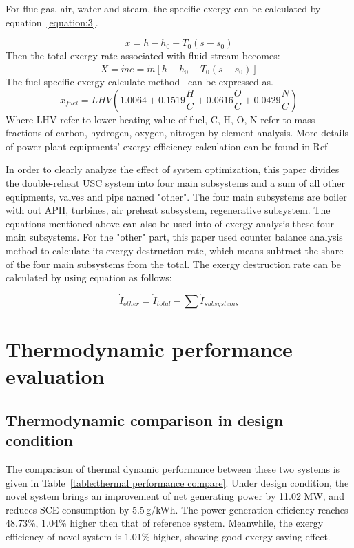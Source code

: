\documentclass[preprint,12pt]{elsarticle}
\begin{document}
For flue gas, air, water and steam, the specific exergy can be calculated by equation~\ref{equation:3}.

\begin{equation}{}
\label{equation:3}
x=h-h_{0}-T_{0}\left(s-s_{0}\right)
\end{equation}
Then the total exergy rate associated with ﬂuid stream becomes:
\begin{equation}
\dot{X}=\dot{m}e=\dot{m}\left[h-h_{0}-T_{0}\left(s-s_{0}\right)\right]{}
\end{equation}
The fuel specific exergy calculate method~\cite{Yan2016The} can be expressed as.
\begin{equation}
x_{fuel}=LHV\left(1.0064+0.1519\frac{H}{C}+0.0616\frac{O}{C}+0.0429\frac{N}{C}\right)
\end{equation}
Where LHV refer to lower heating value of fuel, C, H, O, N refer to mass fractions of carbon, hydrogen, oxygen, nitrogen by element analysis.
More details of power plant equipments' exergy  efficiency calculation can be found in Ref~\cite{G2016Exergy}

In order to clearly analyze the effect of system optimization, this paper divides the double-reheat USC system into four main subsystems and a sum of all other equipments, valves and pips named "other".
The four main subsystems are boiler with out APH, turbines, air preheat subsystem, regenerative subsystem.
The equations mentioned above can also be used into of exergy analysis these four main subsystems.
For the "other" part, this paper used counter balance analysis method to calculate its exergy destruction rate, which means subtract the share of the four main subsystems from the total.
 The exergy destruction rate can be calculated by using equation as follows:

\begin{equation}
\dot{I}_{other}=\dot{I}{}_{total}-\sum\dot{I}{}_{subsystems}
\end{equation}





\section{Thermodynamic performance evaluation} %
\label{sub:Thermodynamic_evaluation}
\subsection{Thermodynamic comparison in design condition}
\label{ssub:desing_compare}
The comparison of thermal dynamic performance between these two systems is given in Table~\ref{table:thermal performance compare}. 
Under design condition, the novel system brings an improvement of net generating power by 11.02 MW, and reduces SCE consumption by 5.5\,g/kWh.
The power generation efficiency reaches 48.73\%, 1.04\% higher then that of reference system.
Meanwhile, the exergy efficiency of novel system is 1.01\% higher, showing good exergy-saving effect. 
\end{document}
